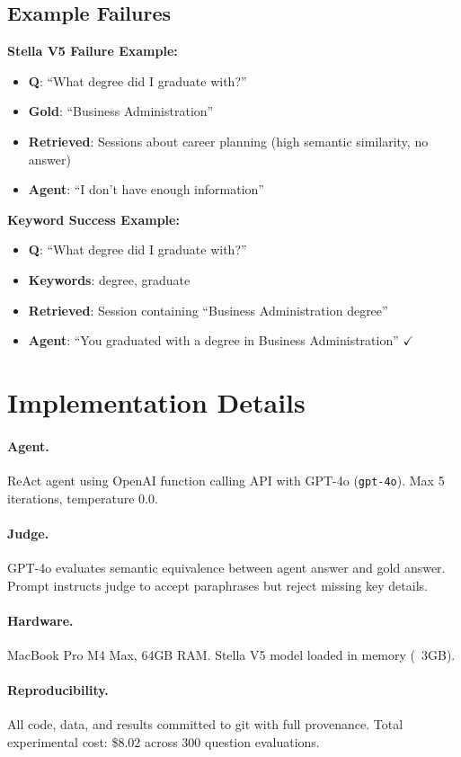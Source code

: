 \documentclass{article}
\begin{document}
\subsection{Example Failures}

\textbf{Stella V5 Failure Example:}
\begin{itemize}
    \item \textbf{Q}: ``What degree did I graduate with?''
    \item \textbf{Gold}: ``Business Administration''
    \item \textbf{Retrieved}: Sessions about career planning (high semantic similarity, no answer)
    \item \textbf{Agent}: ``I don't have enough information''
\end{itemize}

\textbf{Keyword Success Example:}
\begin{itemize}
    \item \textbf{Q}: ``What degree did I graduate with?''
    \item \textbf{Keywords}: degree, graduate
    \item \textbf{Retrieved}: Session containing ``Business Administration degree''
    \item \textbf{Agent}: ``You graduated with a degree in Business Administration'' $\checkmark$
\end{itemize}

\section{Implementation Details}
\label{app:implementation}

\paragraph{Agent.} ReAct agent using OpenAI function calling API with GPT-4o (\texttt{gpt-4o}). Max 5 iterations, temperature 0.0.

\paragraph{Judge.} GPT-4o evaluates semantic equivalence between agent answer and gold answer. Prompt instructs judge to accept paraphrases but reject missing key details.

\paragraph{Hardware.} MacBook Pro M4 Max, 64GB RAM. Stella V5 model loaded in memory (~3GB).

\paragraph{Reproducibility.} All code, data, and results committed to git with full provenance. Total experimental cost: \$8.02 across 300 question evaluations.
\end{document}
